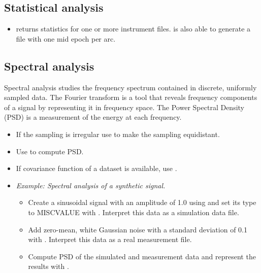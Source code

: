 \subsection{Statistical analysis}
\begin{itemize}
\item {} returns statistics for one or more instrument files.  is also able to generate a  file with one mid epoch per arc.
\end{itemize}

\subsection{Spectral analysis}
Spectral analysis studies the frequency spectrum contained in discrete, uniformly sampled data. The Fourier transform is a tool that reveals frequency components of a signal by representing it in frequency space. The Power Spectral Density (PSD) is a measurement of the energy at each frequency.

\begin{itemize}
\item If the sampling is irregular use  to make the sampling equidistant.
\item Use  to compute PSD.
\item If covariance function of a dataset is available, use .
\item \emph{Example: Spectral analysis of a synthetic signal.}
  \begin{itemize}
  \item Create a sinusoidal signal with an amplitude of 1.0 using  and set its type to MISCVALUE with . Interpret this data as a simulation data file.
  \item Add zero-mean, white Gaussian noise with a standard deviation of 0.1 with . Interpret this data as a real measurement file.
  \item Compute PSD of the simulated and measurement data and represent the results with .
  \end{itemize}
\end{itemize}

